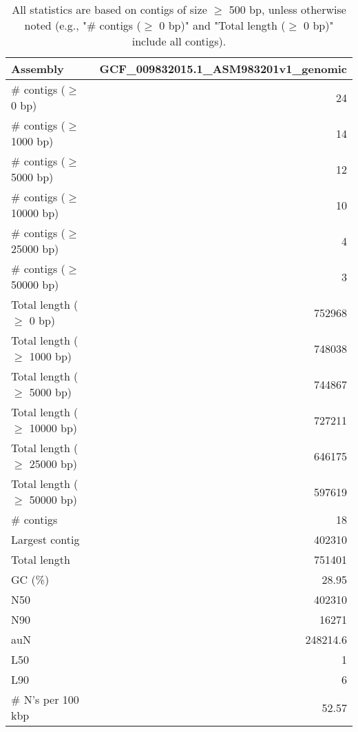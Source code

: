 \documentclass[12pt,a4paper]{article}
\begin{document}
\begin{table}[ht]
\begin{center}
\caption{All statistics are based on contigs of size $\geq$ 500 bp, unless otherwise noted (e.g., "\# contigs ($\geq$ 0 bp)" and "Total length ($\geq$ 0 bp)" include all contigs).}
\begin{tabular}{|l*{1}{|r}|}
\hline
Assembly & GCF\_009832015.1\_ASM983201v1\_genomic \\ \hline
\# contigs ($\geq$ 0 bp) & 24 \\ \hline
\# contigs ($\geq$ 1000 bp) & 14 \\ \hline
\# contigs ($\geq$ 5000 bp) & 12 \\ \hline
\# contigs ($\geq$ 10000 bp) & 10 \\ \hline
\# contigs ($\geq$ 25000 bp) & 4 \\ \hline
\# contigs ($\geq$ 50000 bp) & 3 \\ \hline
Total length ($\geq$ 0 bp) & 752968 \\ \hline
Total length ($\geq$ 1000 bp) & 748038 \\ \hline
Total length ($\geq$ 5000 bp) & 744867 \\ \hline
Total length ($\geq$ 10000 bp) & 727211 \\ \hline
Total length ($\geq$ 25000 bp) & 646175 \\ \hline
Total length ($\geq$ 50000 bp) & 597619 \\ \hline
\# contigs & 18 \\ \hline
Largest contig & 402310 \\ \hline
Total length & 751401 \\ \hline
GC (\%) & 28.95 \\ \hline
N50 & 402310 \\ \hline
N90 & 16271 \\ \hline
auN & 248214.6 \\ \hline
L50 & 1 \\ \hline
L90 & 6 \\ \hline
\# N's per 100 kbp & 52.57 \\ \hline
\end{tabular}
\end{center}
\end{table}
\end{document}
